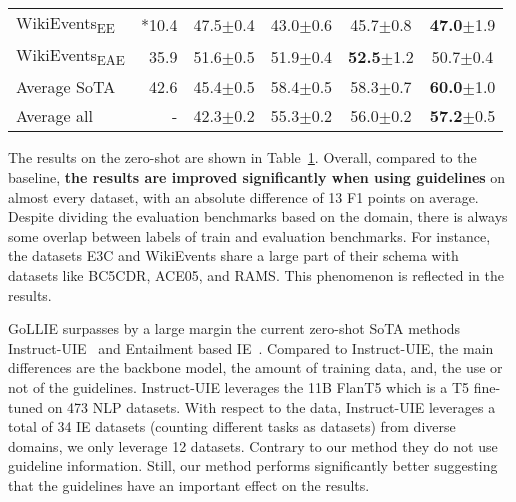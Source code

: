 \begin{table}
{\begin{tabular}{l|r|cc|cc}
            WikiEvents\textsubscript{EE} & \citep{sainz-etal-2022-zs4ie} *10.4 & 47.5${\scriptscriptstyle\pm}$\tiny{0.4} & 43.0${\scriptscriptstyle\pm}$\tiny{0.6} & 45.7${\scriptscriptstyle\pm}$\tiny{0.8} & \textbf{47.0}${\scriptscriptstyle\pm}$\tiny{1.9} \\
            
            WikiEvents\textsubscript{EAE} & \cite{sainz-etal-2022-textual} 35.9 & 51.6${\scriptscriptstyle\pm}$\tiny{0.5} & 51.9${\scriptscriptstyle\pm}$\tiny{0.4} & \textbf{52.5}${\scriptscriptstyle\pm}$\tiny{1.2} & 50.7${\scriptscriptstyle\pm}$\tiny{0.4} \\
            
            \midrule
            Average SoTA & 42.6 & 45.4${\scriptscriptstyle\pm}$\tiny{0.5} & 58.4${\scriptscriptstyle\pm}$\tiny{0.5} & 58.3${\scriptscriptstyle\pm}$\tiny{0.7} & \textbf{60.0}${\scriptscriptstyle\pm}$\tiny{1.0} \\
            
            Average all & - & 42.3${\scriptscriptstyle\pm}$\tiny{0.2} & 55.3${\scriptscriptstyle\pm}$\tiny{0.2} & 56.0${\scriptscriptstyle\pm}$\tiny{0.2} & \textbf{57.2}${\scriptscriptstyle\pm}$\tiny{0.5} \\
            \bottomrule
        \end{tabular}
    }
    \label{tab:zero-results}
    \vspace{-.5em}
\end{table}

The results on the zero-shot are shown in Table~\ref{tab:zero-results}. Overall, compared to the baseline, \textbf{the results are improved significantly when using guidelines} on almost every dataset, with an absolute difference of 13 F1 points on average. Despite dividing the evaluation benchmarks based on the domain, there is always some overlap between labels of train and evaluation benchmarks. For instance, the datasets E3C and WikiEvents share a large part of their schema with datasets like BC5CDR, ACE05, and RAMS. This phenomenon is reflected in the results.

GoLLIE surpasses by a large margin the current zero-shot SoTA methods Instruct-UIE~\citep{DBLP:journals/corr/abs-2304-08085} and Entailment based IE~\citep{sainz-etal-2022-zs4ie}.
Compared to Instruct-UIE, the main differences are the backbone model, the amount of training data, and, the use or not of the guidelines. Instruct-UIE leverages the 11B FlanT5 which is a T5 fine-tuned on 473 NLP datasets. With respect to the data, Instruct-UIE leverages a total of 34 IE datasets (counting different tasks as datasets) from diverse domains, we only leverage 12 datasets. Contrary to our method they do not use guideline information. Still, our method performs significantly better suggesting that the guidelines have an important effect on the results. 


